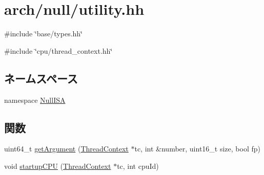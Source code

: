 \hypertarget{null_2utility_8hh}{
\section{arch/null/utility.hh}
\label{null_2utility_8hh}
}
{\ttfamily \#include \char`\"{}base/types.hh\char`\"{}}\par
{\ttfamily \#include \char`\"{}cpu/thread\_\-context.hh\char`\"{}}\par
\subsection*{ネームスペース}
\begin{DoxyCompactItemize}
\item 
namespace \hyperlink{namespaceNullISA}{NullISA}
\end{DoxyCompactItemize}
\subsection*{関数}
\begin{DoxyCompactItemize}
\item 
uint64\_\-t \hyperlink{namespaceNullISA_a9f821ddebea7f029e0889ac47e32f84e}{getArgument} (\hyperlink{classThreadContext}{ThreadContext} $\ast$tc, int \&number, uint16\_\-t size, bool fp)
\item 
void \hyperlink{namespaceNullISA_afba1e99c05313c7755d6377ed098e8e1}{startupCPU} (\hyperlink{classThreadContext}{ThreadContext} $\ast$tc, int cpuId)
\end{DoxyCompactItemize}
